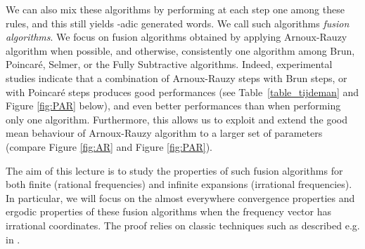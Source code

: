 \documentclass[preliminary,copyright,creativecommons]{eptcs}
\begin{document}
We can also mix these   algorithms by  performing at each step  one  among  these   rules, and this still yields
-adic generated words. We call such  algorithms  {\em fusion algorithms}. We  focus on 
fusion algorithms obtained by  applying Arnoux-Rauzy algorithm when possible, and  otherwise,    consistently  one  algorithm   among    Brun, Poincar\'e, Selmer,
or the Fully Subtractive algorithms. Indeed, experimental studies   indicate that a combination of  Arnoux-Rauzy steps with  Brun steps,  or   with Poincar\'e  steps 
produces     good   performances   (see Table~\ref{table_tijdeman} and    Figure  \ref{fig:PAR} below), and
even better performances    than   when performing only one  algorithm.     Furthermore,  this allows us
to   exploit and extend  the good mean  behaviour of Arnoux-Rauzy  algorithm   to a larger set of parameters  (compare Figure \ref{fig:AR} and Figure \ref{fig:PAR}).


The aim of this lecture is to  study   the properties of     such  fusion   algorithms for both  finite  (rational frequencies) and infinite expansions (irrational  frequencies).
In particular, we will  focus on 
the almost everywhere  convergence properties    and  ergodic  properties of    these fusion  algorithms  when the   frequency  vector
has irrational coordinates. The  proof relies on classic techniques
   such as described  e.g. in \cite{schweiger}.
\end{document}
